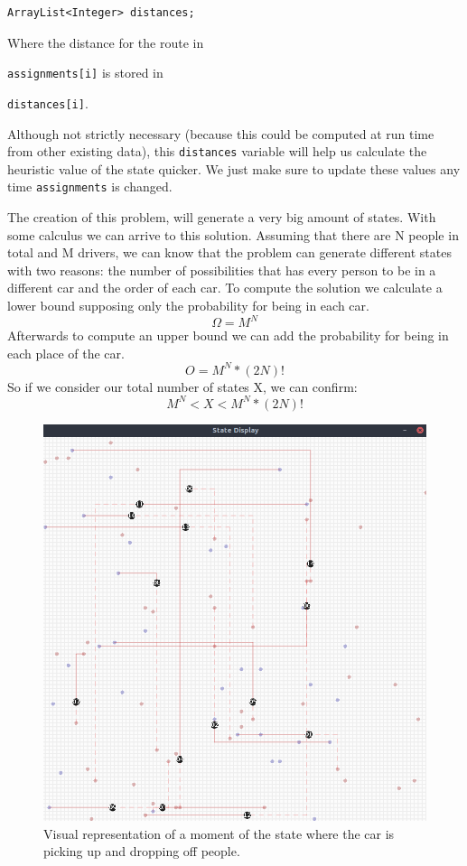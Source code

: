 \documentclass[12]{article}
\begin{document}
\begin{lstlisting}
ArrayList<Integer> distances;
\end{lstlisting}

Where the distance for the route in \raggedright\lstinline{assignments[i]} is stored in \raggedright\lstinline{distances[i]}.

Although not strictly necessary (because this could be computed at run time from other existing data), this \lstinline{distances} variable will help us calculate the heuristic value of the state quicker. We just make sure to update these values any time \lstinline{assignments} is changed.

The creation of this problem, will generate a very big amount of states. With some calculus we can arrive to this solution. Assuming that there are N people in total and M drivers, we can know that
the problem can generate different states with two reasons: the number of possibilities that has every person to be in a different car and the order of each car.
To compute the solution we calculate a lower bound supposing only the probability for being in each car.
$$\Omega = M^N$$
Afterwards to compute an upper bound we can add the probability for being in each place of the car.
$$O = M^N*(2N)!$$
So if we consider our total number of states X, we can confirm:
$$M^N < X < M^N*(2N)!$$

\begin{figure}[H]
\captionsetup{justification=centering}
\centering
\includegraphics[scale=0.35]{images/carsMoving.png}
\caption{Visual representation of a moment of the state where the car is picking up and dropping off people.}
\label{grid}
\end{figure}
\end{document}
